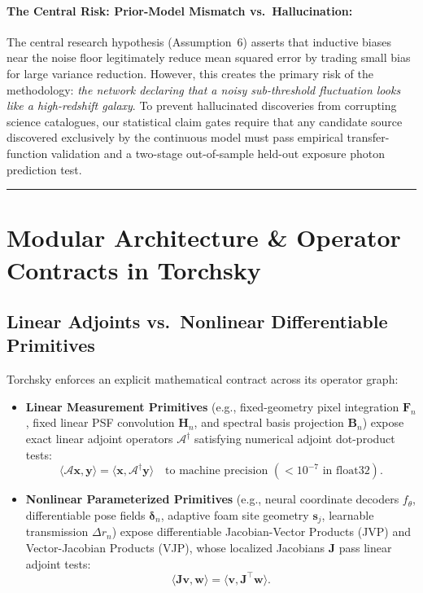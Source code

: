 \documentclass[11pt,a4paper]{article}
\begin{document}
\paragraph{The Central Risk: Prior-Model Mismatch vs.\ Hallucination:}
The central research hypothesis (Assumption~6) asserts that inductive biases near the noise floor legitimately reduce mean squared error by trading small bias for large variance reduction. However, this creates the primary risk of the methodology: \emph{the network declaring that a noisy sub-threshold fluctuation looks like a high-redshift galaxy}. To prevent hallucinated discoveries from corrupting science catalogues, our statistical claim gates require that any candidate source discovered exclusively by the continuous model must pass empirical transfer-function validation and a two-stage out-of-sample held-out exposure photon prediction test.

\vspace{1em}
\hrule
\vspace{1em}

\section{Modular Architecture \& Operator Contracts in Torchsky}

\subsection{Linear Adjoints vs.\ Nonlinear Differentiable Primitives}
Torchsky enforces an explicit mathematical contract across its operator graph:
\begin{itemize}
    \item \textbf{Linear Measurement Primitives} (e.g., fixed-geometry pixel integration $\boldsymbol{F}_n$, fixed linear PSF convolution $\boldsymbol{H}_n$, and spectral basis projection $\boldsymbol{B}_n$) expose exact linear adjoint operators $\mathcal{A}^\dagger$ satisfying numerical adjoint dot-product tests:
    \begin{equation}
    \langle \mathcal{A} \boldsymbol{x}, \boldsymbol{y} \rangle = \langle \boldsymbol{x}, \mathcal{A}^\dagger \boldsymbol{y} \rangle \quad \text{to machine precision } (< 10^{-7} \text{ in float32}).
    \end{equation}
    \item \textbf{Nonlinear Parameterized Primitives} (e.g., neural coordinate decoders $f_\theta$, differentiable pose fields $\boldsymbol{\delta}_n$, adaptive foam site geometry $\boldsymbol{s}_j$, learnable transmission $\Delta r_n$) expose differentiable Jacobian-Vector Products (JVP) and Vector-Jacobian Products (VJP), whose localized Jacobians $\boldsymbol{J}$ pass linear adjoint tests:
    \begin{equation}
    \langle \boldsymbol{J} \boldsymbol{v}, \boldsymbol{w} \rangle = \langle \boldsymbol{v}, \boldsymbol{J}^\top \boldsymbol{w} \rangle.
    \end{equation}
\end{itemize}
\end{document}
